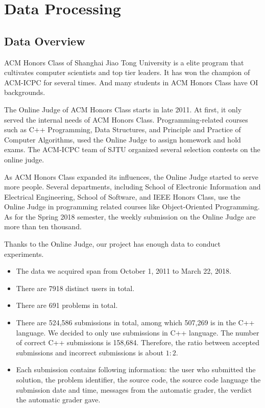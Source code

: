 
\chapter{Data Processing}


\section{Data Overview}

    ACM Honors Class  of Shanghai Jiao Tong University is a elite program
    that cultivates computer scientists and top tier leaders.
    It has won the champion of ACM-ICPC for several times.
    And many students in ACM Honors Class have OI backgrounds.

    The Online Judge of ACM Honors Class  starts in late 2011.
    At first, it only served the internal needs of ACM Honors Class.
    Programming-related courses such as C++ Programming, Data Structures,
    and Principle and Practice of Computer Algorithms,
    used the Online Judge to assign homework and hold exams.
    The ACM-ICPC team of SJTU organized several selection contests on the online judge.

    As ACM Honors Class expanded its influences, the Online Judge started to serve more people.
    Several departments, including School of Electronic Information and Electrical Engineering,
    School of Software, and IEEE Honors Class, use the Online Judge in programming related courses
    like Object-Oriented Programming.
    As for the Spring 2018 semester, the weekly submission on the Online Judge are more than ten thousand.

    Thanks to the Online Judge, our project has enough data to conduct experiments.

    \begin{itemize}
        \item The data we acquired span from October 1, 2011 to March 22, 2018.
        \item There are 7918 distinct users in total.
        \item There are 691 problems in total.
        \item There are 524,586 submissions in total, among which 507,269 is in the C++ language.
            We decided to only use submissions in C++ language.
            The number of correct C++ submissions is 158,684.
            Therefore, the ratio between accepted submissions and incorrect submissions is about $1:2$.
        \item Each submission contains following information:
            the user who submitted the solution,
            the problem identifier,
            the source code,
            the source code language
            the submission date and time,
            messages from the automatic grader,
            the verdict the automatic grader gave.
    \end{itemize}

